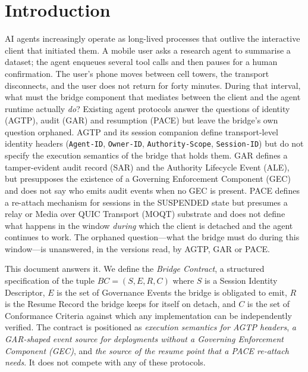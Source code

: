 \section{Introduction}

AI agents increasingly operate as long-lived processes that outlive the
interactive client that initiated them. A mobile user asks a research agent
to summarise a dataset; the agent enqueues several tool calls and then
pauses for a human confirmation. The user's phone moves between cell towers,
the transport disconnects, and the user does not return for forty minutes.
During that interval, what must the bridge component that mediates between
the client and the agent runtime actually \emph{do}? Existing agent
protocols answer the questions of identity (AGTP), audit (GAR) and
resumption (PACE) but leave the bridge's own question orphaned. AGTP \cite{I-D.hood-agtp} and its session companion
\cite{I-D.hood-agtp-session} define transport-level identity headers
(\texttt{Agent-ID}, \texttt{Owner-ID}, \texttt{Authority-Scope},
\texttt{Session-ID}) but do not specify the execution semantics of the
bridge that holds them. GAR \cite{I-D.sato-soos-gar} defines a tamper-evident
audit record (SAR) and the Authority Lifecycle Event (ALE), but presupposes
the existence of a Governing Enforcement Component (GEC) and does not say
who emits audit events when no GEC is present. PACE
\cite{I-D.nandakumar-agentproto-moq-pace} defines a re-attach mechanism for
sessions in the SUSPENDED state but presumes a relay or Media over QUIC
Transport (MOQT) substrate and does not define what happens in the window
\emph{during} which the client is detached and the agent continues to work.
The orphaned question---what the bridge must do during this window---is
unanswered, in the versions read, by AGTP, GAR or PACE.

This document answers it. We define the \emph{Bridge Contract}, a
structured specification of the tuple $BC = (S, E, R, C)$ where $S$ is a
Session Identity Descriptor, $E$ is the set of Governance Events the
bridge is obligated to emit, $R$ is the Resume Record the
bridge keeps for itself on detach, and $C$ is the set of Conformance
Criteria against which any implementation can be independently
verified. The contract is positioned as \emph{execution semantics for
AGTP headers}, \emph{a GAR-shaped event source for deployments
without a Governing Enforcement Component (GEC)}, and \emph{the
source of the resume point that a PACE re-attach
needs}. It does not compete with any of these protocols.

